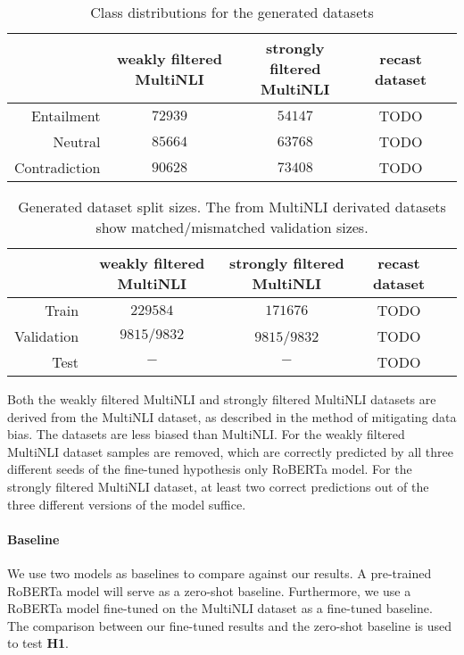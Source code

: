 \begin{table*}[ht]
    \centering
    \caption{Class distributions for the generated datasets}
    \begin{tabular}{r || c | c | c | c}
        &  weakly filtered \acs{MultiNLI} & strongly filtered \acs{MultiNLI} & recast dataset \\
        \midrule
      Entailment  & $72939$ & $54147$ & TODO\\
      Neutral  & $85664$ & $63768$ & TODO\\
      Contradiction  & $90628$ & $73408$ & TODO
    \end{tabular}
    \label{tab:new_datasets:classes}
\end{table*}

\begin{table*}[h]
    \centering
    \caption{Generated dataset split sizes. The from \acs{MultiNLI} derivated datasets show matched/mismatched validation sizes.}
    \begin{tabular}{r || c | c | c | c}
        & weakly filtered \acs{MultiNLI} & strongly filtered \acs{MultiNLI} & recast dataset \\
        \midrule
      Train &  $229584$ & $171676$ & TODO \\
      Validation  & $9815/9832$ & $9815$/$9832$ & TODO \\
      Test  & $ - $ & $ - $ & TODO
    \end{tabular}
    \label{tab:new_datasets:sizes}
\end{table*}

Both the weakly filtered \acs{MultiNLI} and strongly filtered \acs{MultiNLI} datasets are derived from the \acs{MultiNLI} dataset, as described in the method of mitigating data bias. The datasets are less biased than \acs{MultiNLI}. For the weakly filtered \acs{MultiNLI} dataset samples are removed, which are correctly predicted by all three different seeds of the fine-tuned hypothesis only \acs{RoBERTa} model. For the strongly filtered \acs{MultiNLI} dataset, at least two correct predictions out of the three different versions of the model suffice.



\paragraph{Baseline}
We use two models as baselines to compare against our results. A pre-trained \ac{RoBERTa} model will serve as a zero-shot baseline. Furthermore, we use a \ac{RoBERTa} model fine-tuned on the \ac{MultiNLI} dataset as a fine-tuned baseline. The comparison between our fine-tuned results and the zero-shot baseline is used to test \textbf{H1}.

